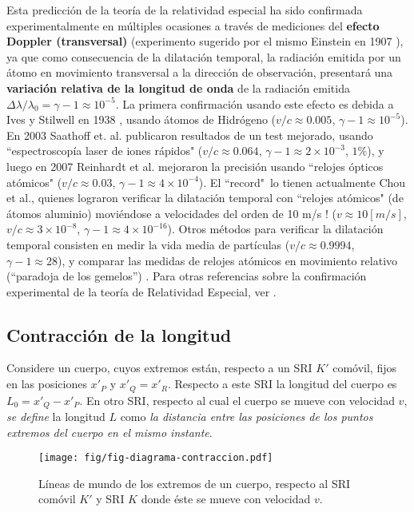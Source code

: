 Esta predicción de la teoría de la relatividad especial ha sido confirmada experimentalmente en múltiples ocasiones a través de mediciones del \textbf{efecto Doppler (transversal)} (experimento sugerido por el mismo Einstein en 1907 \cite{Einstein07}), ya que como consecuencia de la dilatación temporal, la radiación emitida por un átomo en movimiento transversal a la dirección de observación, presentará una \textbf{variación relativa de la longitud de onda} de la radiación emitida $\Delta\lambda/\lambda_0=\gamma-1\approx 10^{-5}$. La primera confirmación usando este efecto es debida a Ives y Stilwell en 1938 \cite{IS38}, usando átomos de Hidrógeno  ($v/c\approx 0.005$, $\gamma-1\approx 10^{-5}$). En 2003 Saathoff et. al. publicaron resultados de un test mejorado, usando ``espectroscopía laser de iones rápidos" \cite{Saathoff03} ($v/c\approx 0.064$, $\gamma-1\approx 2\times 10^{-3}$, $1\%$), y luego en 2007 Reinhardt et al. mejoraron la precisión usando ``relojes ópticos atómicos" \cite{Reinhardt07} ($v/c\approx 0.03$, $\gamma-1\approx 4\times 10^{-4}$). El ``record"\, lo tienen actualmente Chou et al., quienes lograron verificar la dilatación temporal con ``relojes atómicos" (de átomos aluminio) moviéndose a velocidades del orden de 10 m/s ! \cite{Chou10} ($v\approx 10 [m/s]$, $v/c\approx 3\times 10^{-8}$, $\gamma-1\approx 4\times 10^{-16}$). Otros métodos para verificar la dilatación temporal consisten en medir la vida media de partículas \cite{Bailey77} ($v/c\approx 0.9994$, $\gamma-1\approx 28$), y comparar las medidas de relojes atómicos en movimiento relativo (``paradoja de los gemelos'') \cite{HK72a,HK72b}. Para otras referencias sobre la confirmación experimental de la teoría de Relatividad Especial, ver \cite{SRexp}.

\subsection{Contracción de la longitud}
Considere un cuerpo, cuyos extremos están, respecto a un SRI $K'$ comóvil, fijos en las posiciones $x'_P$ y $x'_Q=x'_R$. Respecto a este SRI la longitud del cuerpo es $L_0=x'_Q-x'_P$. En otro SRI, respecto al cual el cuerpo se mueve con velocidad $v$, \textit{se define} la longitud $L$ como \textit{la distancia entre las posiciones de los puntos extremos del cuerpo en el mismo instante}.
\begin{figure}[!h]
\centerline{\texttt{[image: fig/fig-diagrama-contraccion.pdf]}}
 \caption{Líneas de mundo de los extremos de un cuerpo, respecto al SRI comóvil $K'$ y SRI $K$ donde éste se mueve con velocidad $v$.}
\label{fcl}
\end{figure}

